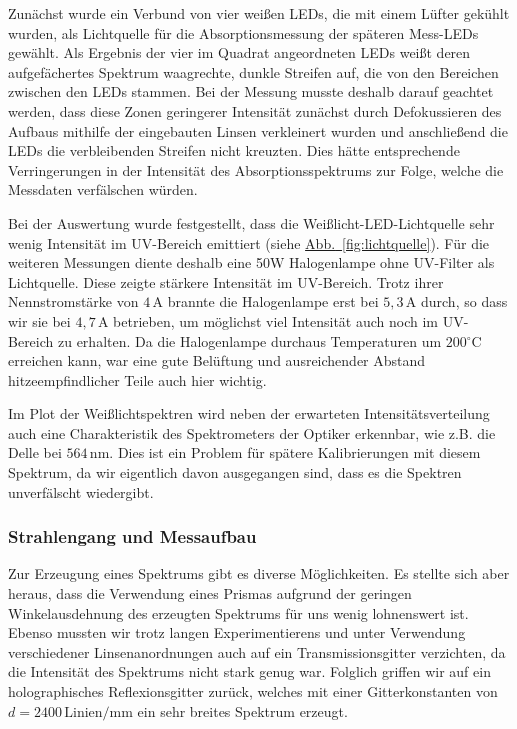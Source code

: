 \documentclass[11pt]{scrartcl}
\newcommand{\unit}[1]{\ensuremath{\,\mathrm{#1}}} %
\newcommand{\degr}{\ensuremath{^\circ}}
\newcommand{\cel}{\ensuremath{\degr\mathrm{C}}}
\newcommand{\hypref}[2]{\hyperref[#2]{{#1}~\ref{#2}}}
\begin{document}
Zun\"achst wurde ein Verbund von vier wei\ss{}en LEDs, die mit einem L\"ufter gek\"uhlt wurden, als Lichtquelle f\"ur die Absorptionsmessung der sp\"ateren Mess-LEDs gew\"ahlt. Als Ergebnis der vier im Quadrat angeordneten LEDs wei\ss{}t deren aufgef\"achertes Spektrum waagrechte, dunkle Streifen auf, die von den Bereichen zwischen den LEDs stammen. Bei der Messung musste deshalb darauf geachtet werden, dass diese Zonen geringerer Intensit\"at zun\"achst durch Defokussieren des Aufbaus mithilfe der eingebauten Linsen verkleinert wurden und anschlie\ss{}end die LEDs die verbleibenden Streifen nicht kreuzten. Dies h\"atte entsprechende Verringerungen in der Intensit\"at des Absorptionsspektrums zur Folge, welche die Messdaten verf\"alschen w\"urden.

Bei der Auswertung wurde festgestellt, dass die Weißlicht-LED-Lichtquelle sehr wenig Intensit\"at im UV-Bereich emittiert (siehe \hypref{Abb.}{fig:lichtquelle}). F\"ur die weiteren Messungen diente deshalb eine 50W Halogenlampe ohne UV-Filter als Lichtquelle. Diese zeigte st\"arkere Intensit\"at im UV-Bereich. Trotz ihrer Nennstromstärke von $4\unit{A}$ brannte die Halogenlampe erst bei $5,3\unit{A}$ durch, so dass wir sie bei $4,7\unit{A}$ betrieben, um möglichst viel Intensität auch noch im UV-Bereich zu erhalten. Da die Halogenlampe durchaus Temperaturen um $200\cel$ erreichen kann, war eine gute Bel\"uftung und ausreichender Abstand hitzeempfindlicher Teile auch hier wichtig.

Im Plot der Weißlichtspektren wird neben der erwarteten Intensitätsverteilung auch eine Charakteristik des Spektrometers der Optiker erkennbar, wie z.B. die Delle bei $564\unit{nm}$. Dies ist ein Problem für spätere Kalibrierungen mit diesem Spektrum, da wir eigentlich davon ausgegangen sind, dass es die Spektren unverfälscht wiedergibt.

\subsubsection{Strahlengang und Messaufbau} %
Zur Erzeugung eines Spektrums gibt es diverse M\"oglichkeiten. Es stellte sich aber heraus, dass die Verwendung eines Prismas aufgrund der geringen Winkelausdehnung des erzeugten Spektrums f\"ur uns wenig lohnenswert ist. Ebenso mussten wir trotz langen Experimentierens und unter Verwendung verschiedener Linsenanordnungen auch auf ein Transmissionsgitter verzichten, da die Intensit\"at des Spektrums nicht stark genug war. Folglich griffen wir auf ein holographisches Reflexionsgitter zur\"uck, welches mit einer Gitterkonstanten von $d=2400\unit{\text{Linien}/mm}$ ein sehr breites Spektrum erzeugt.%
\end{document}
